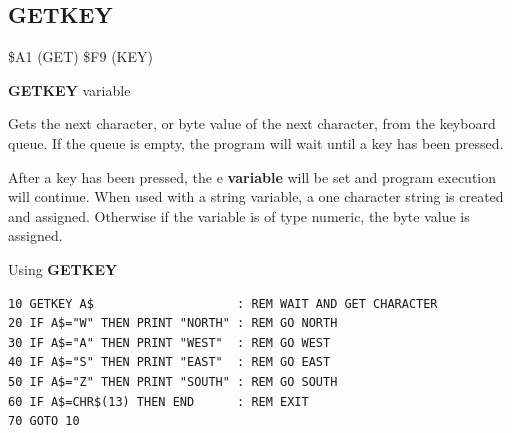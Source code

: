 \subsection{GETKEY}
\begin{description}[leftmargin=2cm,style=nextline]
\item [Token:]    \$A1 (GET) \$F9 (KEY)

\item [Format:]   {\bf GETKEY} variable

\item [Usage:]    Gets the next character, or byte value of the next character, from the keyboard queue. If the queue is empty, the program will wait until a key has been pressed.

                  After a key has been pressed, the e {\bf variable} will be set and program execution will continue. When used with a string variable, a one character string is created and assigned. Otherwise if the variable is of type numeric, the byte value is assigned.

\item [Example:]  Using {\bf GETKEY}

\begin{tcolorbox}[colback=black,coltext=white]
\verbatimfont{\codefont}
\begin{verbatim}
10 GETKEY A$                    : REM WAIT AND GET CHARACTER
20 IF A$="W" THEN PRINT "NORTH" : REM GO NORTH
30 IF A$="A" THEN PRINT "WEST"  : REM GO WEST
40 IF A$="S" THEN PRINT "EAST"  : REM GO EAST
50 IF A$="Z" THEN PRINT "SOUTH" : REM GO SOUTH
60 IF A$=CHR$(13) THEN END      : REM EXIT
70 GOTO 10
\end{verbatim}
\end{tcolorbox}
\end{description}


\newpage
